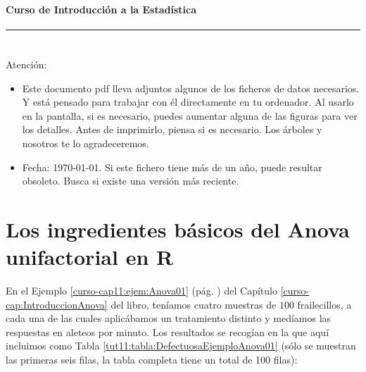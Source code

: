 \documentclass[10pt,a4paper]{article}\usepackage[]{graphicx}\usepackage[]{color}
\newcounter {cont01}
\begin{document}

\paragraph{\hspace{6.3cm}Curso de Introducción a la Estadística\\[2mm]} \noindent\hrule

\setcounter{section}{0}
\section*{\hspace{-0.1cm}} Atención:
\begin{itemize}
  \item Este documento pdf lleva adjuntos algunos de los ficheros de datos necesarios. Y está
      pensado para trabajar con él directamente en tu ordenador. Al usarlo en la pantalla, si es
      necesario, puedes aumentar alguna de las figuras para ver los detalles. Antes de
      imprimirlo, piensa si es necesario. Los árboles y nosotros te lo agradeceremos.
  \item Fecha: \today. Si este fichero tiene más de un año, puede resultar obsoleto. Busca si
      existe una versión más reciente.
\end{itemize}
\setcounter{tocdepth}{1}
\tableofcontents


\section{Los ingredientes básicos del Anova unifactorial en R}
\label{tut11:sec:IngredientesBasicosAnovaEnR}

En el Ejemplo \ref{curso-cap11:ejem:Anova01} (pág. \pageref{curso-cap11:ejem:Anova01}) del Capítulo \ref{curso-cap:IntroduccionAnova} del libro, teníamos cuatro muestras de $100$ frailecillos,  a cada una de las cuales aplicábamos un tratamiento distinto y medíamos las respuestas en aleteos por minuto. Los resultados se recogían en la que aquí incluimos como Tabla \ref{tut11:tabla:DefectuosaEjemploAnova01} (sólo se muestran las primeras seis filas, la tabla completa tiene un total de 100 filas):
\end{document}
